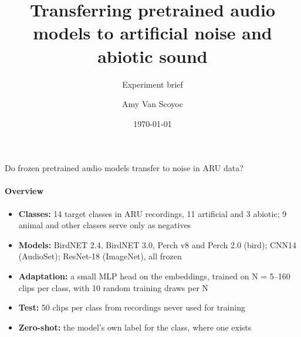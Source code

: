 \documentclass[aspectratio=169,11pt]{beamer}
\title{Transferring pretrained audio models to artificial noise and abiotic sound}
\subtitle{Experiment brief}
\author{Amy Van Scoyoc}
\institute{UC Berkeley}
\date{\today}
\begin{document}
\begin{frame}[plain]
  \vfill\titlepage\vfill
\end{frame}

\begin{frame}{Do frozen pretrained audio models transfer to noise in ARU data?}\framesubtitle{Overview}
  \begin{itemize}\setlength{\itemsep}{0.6em}
    \item \textbf{Classes:} 14 target classes in ARU recordings, 11 artificial and 3 abiotic; 9 animal and other
          classes serve only as negatives
    \item \textbf{Models:} BirdNET 2.4, BirdNET 3.0, Perch v8 and Perch 2.0 (bird); CNN14 (AudioSet);
          ResNet-18 (ImageNet), all frozen
    \item \textbf{Adaptation:} a small MLP head on the embeddings, trained on N = 5--160 clips per class, with
          10 random training draws per N
    \item \textbf{Test:} 50 clips per class from recordings never used for training
    \item \textbf{Zero-shot:} the model's own label for the class, where one exists
  \end{itemize}
\end{frame}
\end{document}
